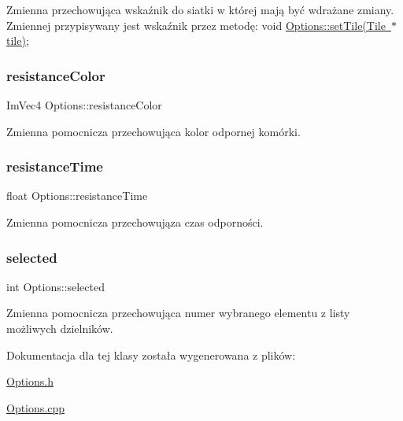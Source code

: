 Zmienna przechowująca wskaźnik do siatki w której mają być wdrażane zmiany. Zmiennej przypisywany jest wskaźnik przez metodę\+: void \mbox{\hyperlink{class_options_a7304b6cb34a2f1bbc5aac543778f1de9}{Options\+::set\+Tile(\+Tile $\ast$tile)}}; \mbox{\label{class_options_a1dcf306ee25499d706f16aa120f2b2d2}} 
\subsubsection{\texorpdfstring{resistance\+Color}{resistanceColor}}
{\footnotesize\ttfamily Im\+Vec4 Options\+::resistance\+Color}

Zmienna pomocnicza przechowująca kolor odpornej komórki. \mbox{\label{class_options_abbe6566b3ae55392365a1a89ece5ff72}} 
\subsubsection{\texorpdfstring{resistance\+Time}{resistanceTime}}
{\footnotesize\ttfamily float Options\+::resistance\+Time}

Zmienna pomocnicza przechowująza czas odporności. \mbox{\label{class_options_af0f36450ab33c6ab5e89113eebdb270b}} 
\subsubsection{\texorpdfstring{selected}{selected}}
{\footnotesize\ttfamily int Options\+::selected}

Zmienna pomocnicza przechowująca numer wybranego elementu z listy możliwych dzielników. 

Dokumentacja dla tej klasy została wygenerowana z plików\+:\begin{DoxyCompactItemize}
\item 
\mbox{\hyperlink{_options_8h}{Options.\+h}}\item 
\mbox{\hyperlink{_options_8cpp}{Options.\+cpp}}\end{DoxyCompactItemize}
